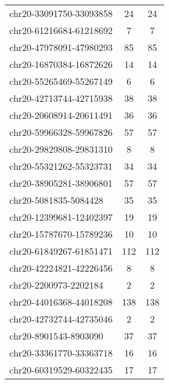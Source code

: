 \begin{longtable}{lSS}
	chr20-33091750-33093858 & 24     & 24                                        \\
	chr20-61216684-61218692 & 7      & 7                                         \\
	chr20-47978091-47980293 & 85     & 85                                        \\
	chr20-16870384-16872626 & 14     & 14                                        \\
	chr20-55265469-55267149 & 6      & 6                                         \\
	chr20-42713744-42715938 & 38     & 38                                        \\
	chr20-20608914-20611491 & 36     & 36                                        \\
	chr20-59966328-59967826 & 57     & 57                                        \\
	chr20-29829808-29831310 & 8      & 8                                         \\
	chr20-55321262-55323731 & 34     & 34                                        \\
	chr20-38905281-38906801 & 57     & 57                                        \\
	chr20-5081835-5084428   & 35     & 35                                        \\
	chr20-12399681-12402397 & 19     & 19                                        \\
	chr20-15787670-15789236 & 10     & 10                                        \\
	chr20-61849267-61851471 & 112    & 112                                       \\
	chr20-42224821-42226456 & 8      & 8                                         \\
	chr20-2200973-2202184   & 2      & 2                                         \\
	chr20-44016368-44018208 & 138    & 138                                       \\
	chr20-42732744-42735046 & 2      & 2                                         \\
	chr20-8901543-8903090   & 37     & 37                                        \\
	chr20-33361770-33363718 & 16     & 16                                        \\
	chr20-60319529-60322435 & 17     & 17                                        \\

\end{longtable}

